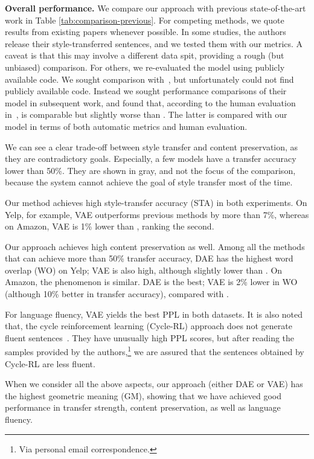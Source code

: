 \documentclass[11pt,a4paper]{article}
\begin{document}
\textbf{Overall performance.}
We compare our approach with previous state-of-the-art work in Table \ref{tab:comparison-previous}.
For competing methods, we quote results from existing papers whenever possible. In some studies, the authors release their style-transferred sentences, and we tested them with our metrics. A caveat is that this may involve a different data spit, providing a rough (but unbiased) comparison. For others, we re-evaluated the model using publicly available code. We sought comparison with~\citet{hu2017toward}, but unfortunately could not find publicly available code. Instead we sought performance comparisons of their model in subsequent work, and found that, according to the human evaluation in~\citet{shen2017style}, \citet{hu2017toward} is comparable but slightly worse than \citet{shen2017style}. The latter is compared with our model in terms of both automatic metrics and human evaluation.

We can see a clear trade-off between style transfer and content preservation, as they are contradictory goals. Especially, a few models have a transfer accuracy lower than 50\%. They are shown in gray, and not the focus of the comparison, because the system cannot achieve the goal of style transfer most of the time.

Our method achieves high style-transfer accuracy (STA) in both experiments.
On Yelp, for example, VAE outperforms previous methods by more than 7\%, whereas on Amazon, VAE is 1\% lower than \citet{prabhumoye2018style}, ranking the second.

Our approach achieves high content preservation as well.
Among all the methods that can achieve more than 50\% transfer accuracy, DAE has the highest word overlap (WO) on Yelp; VAE is also high, although slightly lower than \citet{li2018delete}.
On Amazon, the phenomenon is similar. DAE is the best; VAE is 2\% lower in WO  (although 10\% better in transfer accuracy), compared with \citet{xu2018unpaired}.

For language fluency, VAE yields the best PPL in both datasets. It is also noted that, the cycle reinforcement learning (Cycle-RL) approach does not generate fluent sentences~\cite{xu2018unpaired}. They have unusually high PPL scores, but after reading the samples provided by the authors,\footnote{Via personal email correspondence.} we are assured that the sentences obtained by Cycle-RL are less fluent.

When we consider all the above aspects, our approach (either DAE or VAE) has the highest geometric meaning (GM), showing that we have achieved good performance in transfer strength, content preservation, as well as language fluency.
\end{document}
